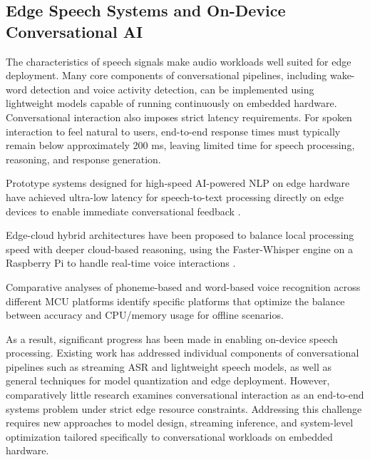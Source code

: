 \documentclass[conference]{IEEEtran}
\begin{document}
\subsection{Edge Speech Systems and On-Device Conversational AI}
The characteristics of speech signals make audio workloads well suited for edge deployment. Many core components of conversational pipelines, including wake-word detection and voice activity detection, can be implemented using lightweight models capable of running continuously on embedded hardware. Conversational interaction also imposes strict latency requirements. For spoken interaction to feel natural to users, end-to-end response times must typically remain below approximately 200 ms, leaving limited time for speech processing, reasoning, and response generation.

Prototype systems designed for high-speed AI-powered NLP on edge hardware have achieved ultra-low latency for speech-to-text processing directly on edge devices to enable immediate conversational feedback \cite{info16080685} .

Edge-cloud hybrid architectures have been proposed to balance local processing speed with deeper cloud-based reasoning, using the Faster-Whisper engine on a Raspberry Pi to handle real-time voice interactions \cite{10.1145/3776942.3776981}.

Comparative analyses of phoneme-based and word-based voice recognition across different MCU platforms identify specific platforms that optimize the balance between accuracy and CPU/memory usage for offline scenarios\cite{10711025}.

As a result, significant progress has been made in enabling on-device speech processing. 
Existing work has addressed individual components of conversational pipelines such as streaming ASR and lightweight speech models, as well as general techniques for model quantization and edge deployment. 
However, comparatively little research examines conversational interaction as an end-to-end systems problem under strict edge resource constraints.
Addressing this challenge requires new approaches to model design, streaming inference, and system-level optimization tailored specifically to conversational workloads on embedded hardware.
\end{document}
